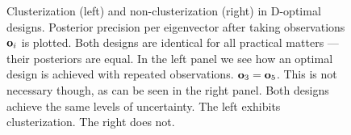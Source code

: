 \begin{figure}
  \caption{Clusterization (left) and non-clusterization (right) in
    D-optimal designs. Posterior precision per eigenvector after
    taking observations $\mathbf{o}_i$ is plotted. Both designs are
    identical for all practical matters --- their posteriors are
    equal. In the left panel we see how an optimal design is achieved
    with repeated observations. $\mathbf{o}_3 = \mathbf{o}_5$. This is not
    necessary though, as can be seen in the right panel. Both designs
    achieve the same levels of uncertainty. The left exhibits
    clusterization. The right does not.}
  \label{fig:clusterization}
\end{figure}





